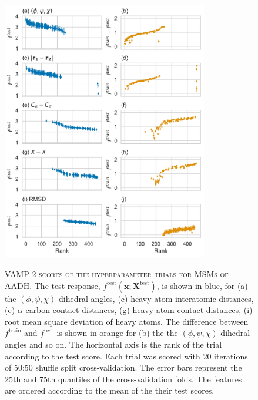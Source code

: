 \begin{figure}[p]
    \centering
    \caption[VAMP-2 scores of the hyperparameter trials for MSMs of AADH]{\textsc{VAMP-2 scores of the hyperparameter trials for MSMs of AADH}. The test response, $f^{\mathrm{test}}(\mathbf{x}; \mathbf{X}^{\mathrm{test}})$, is shown in blue, for (a) the $(\phi, \psi, \chi)$ dihedral angles, (c) heavy atom interatomic distances, (e) $\alpha$-carbon contact distances, (g) heavy atom contact distances, (i) root mean square deviation of heavy atoms. The difference between $f^{\mathrm{train}}$ and $f^{\mathrm{test}}$ is shown in orange for (b) the the $(\phi, \psi, \chi)$ dihedral angles and so on. The horizontal axis is the rank of the trial according to the test score. Each trial was scored with \num{20} iterations of 50:50 shuffle split cross-validation. The error bars represent the 25th and 75th quantiles of the cross-validation folds. The features are ordered according to the mean of the their test scores.}
    \includegraphics[width=0.8\textwidth]{chapters/msm_optimization/figures/aadh_train_test_results.png}
    \label{fig:aad_train_test}
\end{figure}

